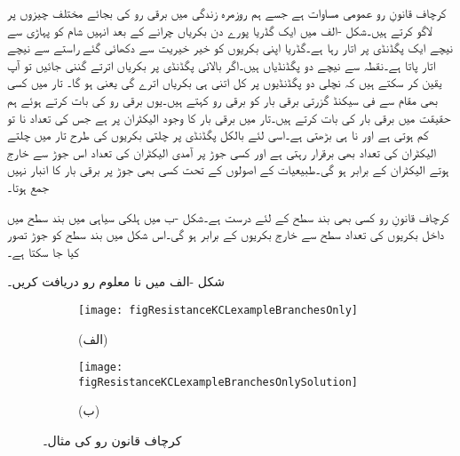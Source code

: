 کرچاف قانونِ رو عمومی مساوات ہے جسے ہم روزمرہ  زندگی میں برقی رو کی بجائے مختلف چیزوں پر لاگو کرتے ہیں۔شکل -الف میں ایک گڈریا پورے دن  بکریاں چرانے کے بعد انہیں شام کو  پہاڑی سے نیچے ایک پگڈنڈی پر اتار رہا ہے۔گڈریا اپنی بکریوں کو خیر خیریت سے دکھائی گئے راستے سے نیچے اتار پاتا ہے۔نقطہ  سے نیچے دو پگڈنڈیاں ہیں۔اگر بالائی پگڈنڈی پر  بکریاں اترتے گننی جائیں تو آپ یقین کر سکتے ہیں کہ نچلی دو پگڈنڈیوں پر کل اتنی ہی بکریاں اترے گی یعنی  ہو گا۔ تار میں کسی بھی مقام سے فی سیکنڈ گزرتی برقی بار کو برقی رو کہتے ہیں۔یوں برقی رو کی بات کرتے ہوئے ہم حقیقت میں برقی بار کی بات کرتے ہیں۔تار میں برقی بار کا وجود الیکٹران پر ہے جس کی تعداد نا تو کم ہوتی ہے اور نا ہی بڑھتی ہے۔اسی لئے بالکل پگڈنڈی پر چلتی بکریوں کی طرح تار میں چلتے الیکٹران کی تعداد بھی برقرار رہتی ہے اور کسی جوڑ پر آمدی الیکٹران کی تعداد اس جوڑ سے خارج ہوتے الیکٹران کے برابر ہو گی۔طبیعیات کے اصولوں کے تحت کسی بھی جوڑ پر برقی بار کا انبار نہیں جمع ہوتا۔ 

کرچاف قانونِ رو  کسی بھی بند سطح کے لئے درست ہے۔شکل -ب میں ہلکی سیاہی میں بند سطح میں داخل بکریوں کی تعداد سطح سے خارج بکریوں کے برابر ہو گی۔اس شکل میں بند سطح کو جوڑ  تصور کیا جا سکتا ہے۔

\FloatBarrier
{}
شکل -الف میں نا معلوم رو دریافت کریں۔ 

\begin{figure}
\centering
\begin{subfigure}{0.5\textwidth}
\centering
\texttt{[image: figResistanceKCLexampleBranchesOnly]}
\caption*{(الف)}
\end{subfigure}%
%
\begin{subfigure}{0.5\textwidth}
\centering
\texttt{[image: figResistanceKCLexampleBranchesOnlySolution]}
\caption*{(ب)}
\end{subfigure}%
\caption{کرچاف قانون رو کی مثال۔}
\label{شکل_مزاحمتی_کرچاف_قانون_رو_مثال}
\end{figure}

